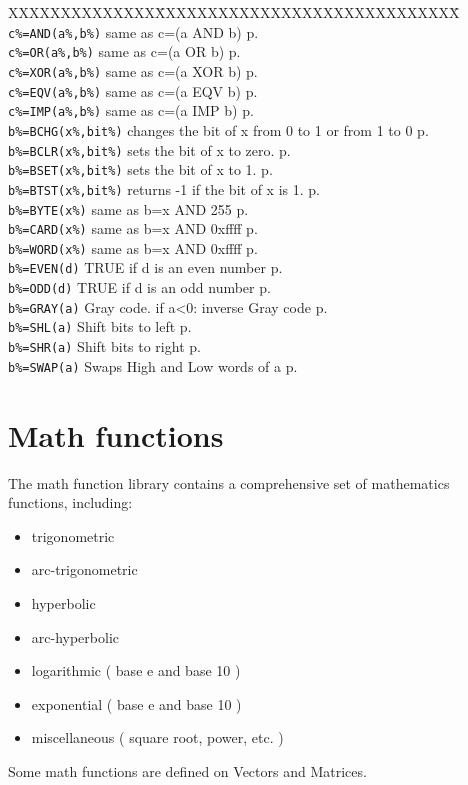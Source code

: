 \begin{tabbing}
XXXXXXXXXXXXXX\=XXXXXXXXXXXXXXXXXXXXXXXXXXXXX\=\kill\\
\verb|c%=AND(a%,b%)|	\> same as c=(a AND b)\> p.\pageref{AND}\\
\verb|c%=OR(a%,b%)|	\> same as c=(a OR b)\> p.\pageref{OR}\\
\verb|c%=XOR(a%,b%)|	\> same as c=(a XOR b)\> p.\pageref{XOR}\\
\verb|c%=EQV(a%,b%)|	\> same as c=(a EQV b)\> p.\pageref{EQV}\\
\verb|c%=IMP(a%,b%)|	\> same as c=(a IMP b)\> p.\pageref{IMP}\\
\verb|b%=BCHG(x%,bit%)|\> changes the bit of x from 0 to 1 or from 1 to 0\> p.\pageref{BCHG}\\
\verb|b%=BCLR(x%,bit%)|\> sets the bit of x to zero.\> p.\pageref{BCLR}\\
\verb|b%=BSET(x%,bit%)|\> sets the bit of x to 1.\> p.\pageref{BSET}\\
\verb|b%=BTST(x%,bit%)|\> returns -1 if the bit of x is 1.\> p.\pageref{BTST}\\
\verb|b%=BYTE(x%)|     \> same as b=x AND 255\> p.\pageref{BYTE}\\
\verb|b%=CARD(x%)|     \> same as b=x AND 0xffff \> p.\pageref{CARD}\\
\verb|b%=WORD(x%)|     \> same as b=x AND 0xffff \> p.\pageref{WORD}\\
\verb|b%=EVEN(d)|	\> TRUE if d is an even number\> p.\pageref{EVEN}\\
\verb|b%=ODD(d)|	\> TRUE if d is an odd number\> p.\pageref{ODD}\\
\verb|b%=GRAY(a)|      \>Gray code. if a<0: inverse Gray code\> p.\pageref{GRAY}\\
\verb|b%=SHL(a)|      \>Shift bits to left\> p.\pageref{SHL}\\
\verb|b%=SHR(a)|      \>Shift bits to right\> p.\pageref{SHR}\\
\verb|b%=SWAP(a)|      \>Swaps High and Low words of a \> p.\pageref{SWAP}\\
\end{tabbing}

\section{Math functions}

  The math function library contains a comprehensive set of mathematics
  functions, including:
\begin{itemize}
\item	trigonometric
\item	arc-trigonometric
\item	hyperbolic
\item	arc-hyperbolic
\item	logarithmic  ( base e and base 10 )
\item	exponential  ( base e and base 10 )
\item	miscellaneous  ( square root, power, etc. )
\end{itemize}
  Some math functions are defined on Vectors and Matrices.


